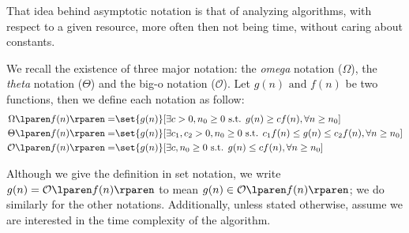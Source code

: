 \documentclass{subfiles}
\begin{document}
    That idea behind asymptotic notation is that of analyzing algorithms,
        with respect to a given resource, more often then not being time,
        without caring about constants.

    We recall the existence of three major notation: the \emph{omega} notation 
        (\(\Omega\)), the \emph{theta} notation (\(\Theta\)) and the big-o notation 
        (\(\mathcal{O}\)). Let \(g(n) \text{ and } f(n)\) be two functions,
        then we define each notation as follow:
        \[\begin{aligned}
            \ofW{f(n)} =& \set{g(n)}[ %
                \exists c > 0, n_{0} \ge 0 \text{ s.t. } %
                    g(n) \ge cf(n), \forall n \ge n_{0}%
            ]\\ 
            \ofT{f(n)} =& \set{g(n)}[ %
                \exists c_{1}, c_{2} > 0, n_{0} \ge 0 \text{ s.t. } %
                    c_{1}f(n) \le g(n) \le c_{2}f(n), \forall n \ge n_{0} %
            ]\\ 
            \ofO{f(n)} =& \set{g(n)}[ %
                \exists c, n_{0} \ge 0 \text{ s.t. } %
                    g(n) \le cf(n), \forall n \ge n_{0} %
            ]
        \end{aligned}\]
    
    Although we give the definition in set notation, 
        we write \(g(n) = \ofO{f(n)}\) to mean \(g(n) \in \ofO{f(n)}\);
        we do similarly for the other notations. Additionally,
        unless stated otherwise, assume we are interested in the time complexity of the algorithm.
\end{document}
